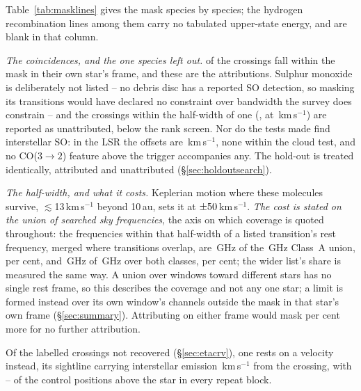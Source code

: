 Table~\ref{tab:masklines} gives the
mask species by species; the hydrogen recombination lines among them carry
no tabulated upper-state energy, and are blank in that column.

\begin{table}
\centering
\footnotesize
\caption{The line mask, by species: the number $N$ of transitions, the
frequency range they span inside the searched intervals and their
upper-state energies.}
\label{tab:masklines}

\end{table}

\emph{The coincidences, and the one species left out.} \MkNCoinc{} of the
\NCross{} crossings fall within the mask in their own star's frame, and these
are the \MkAttr{} attributions. Sulphur monoxide is deliberately not listed --
no debris disc has a reported SO detection, so masking its \SoNTrans{}
transitions would have declared no constraint over bandwidth the survey does
constrain -- and the \SoNCrossWord{} crossings within the half-width of one
(\SoStars, at \SoDvList\,km\,s$^{-1}$) are reported as unattributed,
\SoNBelowScreen{} below the rank screen. Nor do the tests made find
interstellar SO: in the LSR the offsets are \SoDvLsrList\,km\,s$^{-1}$, none within
the cloud test, and no CO($3\to2$) feature above the trigger accompanies any.
The hold-out is treated identically, \HoNAttr{} attributed and \HoNUnattr{}
unattributed (\S\ref{sec:holdoutsearch}).

\emph{The half-width, and what it costs.} Keplerian motion where these
molecules survive, $\lesssim$13\,km\,s$^{-1}$ beyond 10\,au, sets it at
$\pm50$\,km\,s$^{-1}$. \emph{The cost is stated on the union of
searched sky frequencies}, the axis on which coverage is quoted throughout:
the frequencies within that half-width of a listed transition's rest
frequency, merged where transitions overlap, are \MkMaskAGHz\,GHz of the
\CvUnionA\,GHz Class~A union, \MkMaskAPct{} per cent, and \FrMaskLostGHz\,GHz
of \FrMaskUnionGHz\,GHz over both classes, \FrMaskPct{} per cent; the wider
list's share is measured the same way. A union over windows toward different
stars has no single rest frame, so this describes the coverage and not any one
star; a limit is formed instead over its own window's channels outside the
mask in that star's own frame (\S\ref{sec:summary}). Attributing on either
frame would mask \LsMaskAddPct{} per cent more for no further attribution.

Of the \MkAttrExcl{} labelled crossings not recovered (\S\ref{sec:etacrv}),
one rests on a velocity instead, its sightline carrying interstellar emission
\LsLupDv\,km\,s$^{-1}$ from the crossing, with \RqAjNgeLo--\RqAjNgeHi{} of
the \NCtrl{} control positions above the star in every repeat block.
